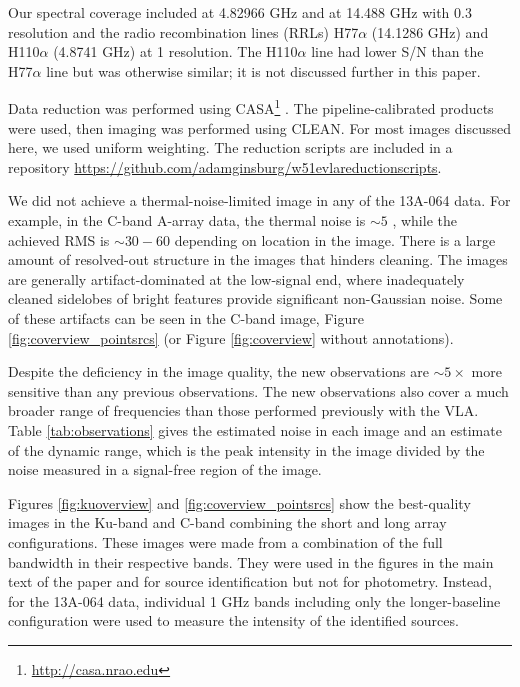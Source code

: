 Our spectral coverage included \ortho
\oneone at 4.82966 GHz and \twotwo at 14.488 GHz with 0.3 \kms resolution and the
radio recombination lines (RRLs) H77$\alpha$ (14.1286 GHz) and H110$\alpha$
(4.8741 GHz) at 1 \kms resolution.  The H110$\alpha$ line had lower S/N than
the H77$\alpha$ line but was otherwise similar; it is not discussed further
in this paper.


Data reduction was performed using CASA\footnote{\url{http://casa.nrao.edu}}
\citep{McMullin2007a}.  The pipeline-calibrated products were
used, then imaging was performed using CLEAN.  For most images discussed here, we
used uniform weighting.  The reduction scripts are included in a repository
\url{https://github.com/adamginsburg/w51evlareductionscripts}.



We did not achieve a thermal-noise-limited image in any of the 13A-064 data.
For example, in the C-band A-array data, the thermal noise is $\sim5$ \microjy,
while the achieved RMS is $\sim30-60$ \microjy depending on location in the
image.  There is a large amount of resolved-out structure in the images that
hinders cleaning.  The images are generally artifact-dominated at the
low-signal end, where inadequately cleaned sidelobes of bright features provide
significant non-Gaussian noise.  Some of these artifacts can be seen in the C-band
image, Figure \ref{fig:coverview_pointsrcs} (or Figure \ref{fig:coverview}
without annotations).

Despite the deficiency in the image quality, the new observations are
$\sim5\times$ more sensitive than any previous observations.  The new
observations also cover a much broader range of frequencies than those
performed previously with the VLA.  Table \ref{tab:observations} gives the
estimated noise in each image and an estimate of the dynamic range, which is
the peak intensity in the image divided by the noise measured in a signal-free
region of the image.  

Figures \ref{fig:kuoverview} and \ref{fig:coverview_pointsrcs} show the
best-quality
images in the Ku-band and C-band combining the short and long array
configurations.  These images were made from a combination of the full
bandwidth in their respective bands. They were used in the figures in the main
text of the paper and for source identification but not for photometry.
Instead, for the 13A-064 data, individual 1 GHz bands including only the
longer-baseline configuration were used to measure the intensity of the
identified sources.

